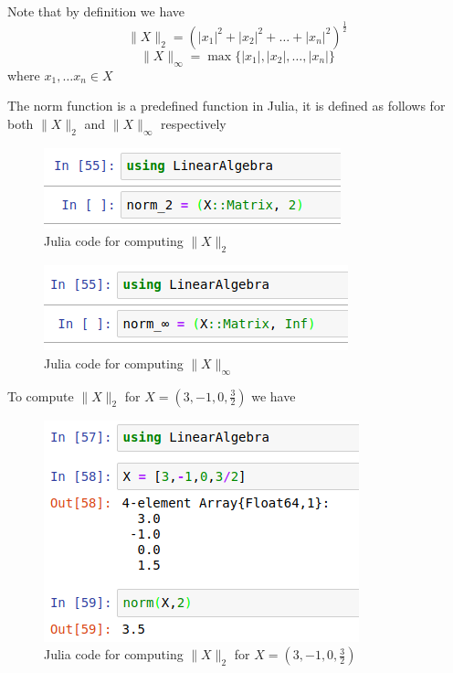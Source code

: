 \documentclass[a4paper,12pt,openany]{book}
\begin{document}
\begin{problem}[Norms]
	
\end{problem}
\begin{soln}
	Note that by definition we have 
	$$\| X\|_{2} = \left( |x_1|^2 + |x_2|^2 + \ldots + |x_n|^2 \right) ^ {\frac{1}{2}} $$
	$$\|X\|_{\infty} = \max \{ |x_1|, |x_2|, \ldots , |x_n| \} $$
	where $x_1, \ldots x_n \in X$
	
	The norm function is a predefined function in Julia, it is defined as follows for both $\| X\|_2$  and $\|X\|_\infty$ respectively
	\begin{figure}[H]
		\centering
		\includegraphics[width= .7\linewidth]{pic18}
		\caption{Julia code for computing $ \|X\|_2$ }
	\end{figure}
\begin{figure}[H]
	\centering
	\includegraphics[width= .7\linewidth]{pic19}
	\caption{Julia code for computing $ \|X\|_\infty$ }
\end{figure}
To compute $\|X\|_2$ for $X = \left( 3,-1, 0,\frac{3}{2} \right)$ we have
\begin{figure}[H]
	\centering
	\includegraphics[width= .7\linewidth]{pic20}
	\caption{Julia code for computing $ \|X\|_2$ for $X = \left( 3,-1, 0,\frac{3}{2} \right)$}
\end{figure}

\end{soln}
\end{document}
